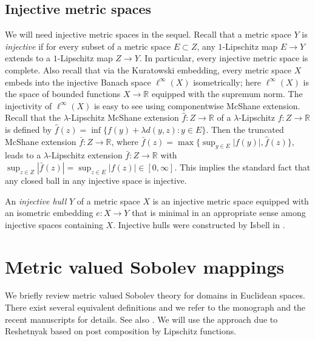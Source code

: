 \documentclass[a4paper,leqno]{amsart}
\numberwithin{equation}{section}
\theoremstyle{remark}
\theoremstyle{remark}
\newcommand{\R}{\mathbb{R}}
\begin{document}
\subsection{Injective metric spaces}\label{section-injective-metric-spaces}
We will need injective metric spaces in the sequel. Recall that a metric space $Y$ is \emph{injective} if for every subset of a metric space $E \subset Z$, any $1$-Lipschitz map $E \to Y$ extends to a $1$-Lipschitz map $Z \to Y$. In particular, every injective metric space is complete. Also recall that via the Kuratowski embedding, every metric space $X$ embeds into the injective Banach space $\ell^{\infty}(X)$ isometrically; here $\ell^{\infty}(X)$ is the space of bounded functions $X \to \mathbb{R}$ equipped with the supremum norm. The injectivity of $\ell^{\infty}(X)$ is easy to see using componentwise McShane extension. Recall that the $\lambda$-Lipschitz McShane extension $\hat{f} \colon Z \to \R$ of a $\lambda$-Lipschitz $f \colon Z \to \R$ is defined by $\hat{f}(z) = \inf\{ f(y) + \lambda d(y,z) \colon y \in E \}$. Then the truncated McShane extension $\bar{f} \colon Z \to \R$, where $\bar{f}(z) = \max\{ \sup_{y \in E} |f(y)|, \hat{f}(z) \}$, leads to a $\lambda$-Lipschitz extension $\bar{f} \colon Z \to \R$ with $\sup_{z \in Z} |\bar{f}(z)| = \sup_{z \in E} |f(z)| \in [0,\infty]$. This implies the standard fact that any closed ball in any injective space is injective.



An \emph{injective hull} $Y$ of a metric space $X$ is an injective metric space equipped with an isometric embedding $e \colon X \to Y$ that is minimal in an appropriate sense among injective spaces containing $X$. Injective hulls were constructed by Isbell in \cite{isbell-1964-six-theorems-about-injective-metric-spaces}.








\section{Metric valued Sobolev mappings}\label{sec:sobolevmaps}
We briefly review metric valued Sobolev theory for domains in Euclidean spaces. There exist several equivalent definitions and we refer to the monograph \cite{Hei:Kos:Sha:Ty:15} and the recent manuscripts \cite{Lyt:Wen:17:areamini,Creu:Evs:24} for details. See also \cite{Kor:Sch:93,Haj:96,Sha:00,Hei:Kos:Sha:Ty:01}. We will use the approach due to Reshetnyak \cite{Res:97} based on post composition by Lipschitz functions.
\end{document}
